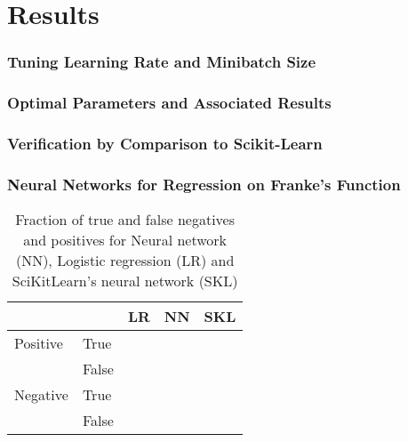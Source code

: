 \section{Results}
\label{sec:results}

\subsubsection{Tuning Learning Rate and Minibatch Size}

\subsubsection*{Optimal Parameters and Associated Results}

\subsubsection{Verification by Comparison to Scikit-Learn}

\subsubsection{Neural Networks for Regression on Franke's Function}


\begin{table}[htbp]
\caption{Fraction of true and false negatives and positives for Neural network (NN), Logistic regression (LR) and SciKitLearn's neural network (SKL)}
	\begin{tabular}{l  l  r  r  r} 
		 & & \textbf{LR} & \textbf{NN} & \textbf{SKL} \\
		 \hline
		Positive & True & & & \\ 
		 & False &  & & \\ 
		 \hline
		Negative & True & &  & \\ 
		& False & & & \\
	\end{tabular}
\label{tab:confusion}
\end{table}

\begin{figure}[htbp]
	\centering
	\caption{}
	\label{fig:}
\end{figure}
